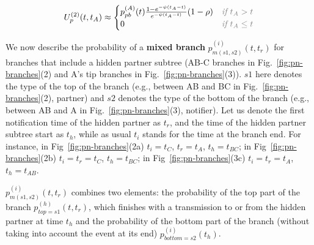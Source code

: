 \documentclass[10pt,letterpaper]{article}
\begin{document}
\begin{equation}
U_p^{(2)}(t, t_A) \approx 
\begin{cases}
p_{pb}^{(A)}(t) \frac{1 - e^{-\psi(t_A - t)}}{e^{-\psi(t_A - t)}} (1 - \rho)& \textit{\color{gray} if $t_A > t$}\\
0 & \textit{\color{gray} if $t_A \leq t$}
\end{cases}
\end{equation}





We now describe the probability of a\textbf{ mixed branch} $p_{m(s1,s2)}^{(i)}(t,t_r)$ for branches that include a hidden partner subtree (AB-C branches in Fig.~\ref{fig:pn-branches}(2) and A's tip branches in Fig.~\ref{fig:pn-branches}(3)). $s1$ here denotes the type of the top of the branch (e.g., between AB and BC in Fig.~\ref{fig:pn-branches}(2), partner) and $s2$ denotes the type of the bottom of the branch (e.g., between AB and A in Fig.~\ref{fig:pn-branches}(3), notifier). Let us denote the first notification time of the hidden partner as $t_r$, and the time of the hidden partner subtree start as $t_h$, while as usual $t_i$ stands for the time at the branch end.  For instance, in Fig~\ref{fig:pn-branches}(2a) $t_i=t_C$, $t_r=t_A$, $t_h=t_{BC}$; in Fig~\ref{fig:pn-branches}(2b) $t_i=t_r=t_C$, $t_h=t_{BC}$; in Fig~\ref{fig:pn-branches}(3c) $t_i=t_r=t_A$, $t_h=t_{AB}$. 

$p_{m(s1,s2)}^{(i)}(t,t_r)$ combines two elements: the probability of the top part of the branch $p_{top=s1}^{(h)}(t, t_r)$, which finishes with a transmission to or from the hidden partner at time $t_h$ and the probability of the bottom part of the branch (without taking into account the event at its end) $p_{bottom=s2}^{(i)}(t_h)$.
\end{document}
